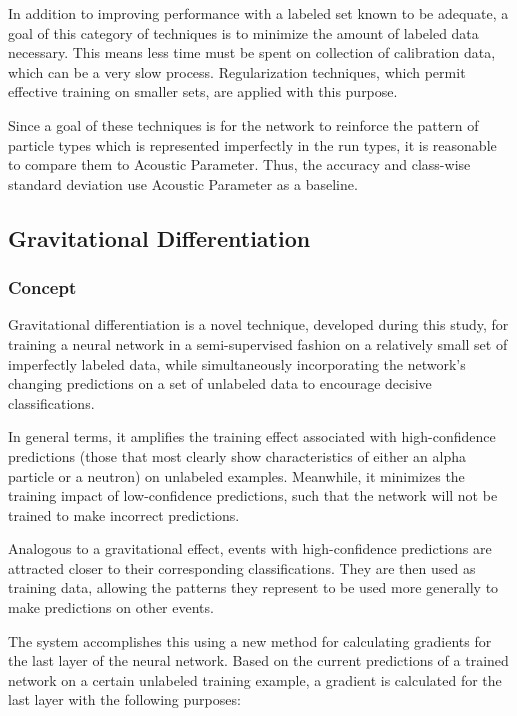 \documentclass[10pt]{article}
\begin{document}
In addition to improving performance with a labeled set known to be adequate, a goal of this category of techniques is to minimize the amount of labeled data necessary. This means less time must be spent on collection of calibration data, which can be a very slow process. Regularization techniques, which permit effective training on smaller sets, are applied with this purpose.

Since a goal of these techniques is for the network to reinforce the pattern of particle types which is represented imperfectly in the run types, it is reasonable to compare them to Acoustic Parameter. Thus, the accuracy and class-wise standard deviation use Acoustic Parameter as a baseline.

\subsection{Gravitational Differentiation}

\subsubsection{Concept}

Gravitational differentiation is a novel technique, developed during this study, for training a neural network in a semi-supervised fashion on a relatively small set of imperfectly labeled data, while simultaneously incorporating the network's changing predictions on a set of unlabeled data to encourage decisive classifications.

In general terms, it amplifies the training effect associated with high-confidence predictions (those that most clearly show characteristics of either an alpha particle or a neutron) on unlabeled examples. Meanwhile, it minimizes the training impact of low-confidence predictions, such that the network will not be trained to make incorrect predictions.

Analogous to a gravitational effect, events with high-confidence predictions are attracted closer to their corresponding classifications. They are then used as training data, allowing the patterns they represent to be used more generally to make predictions on other events.

The system accomplishes this using a new method for calculating gradients for the last layer of the neural network. Based on the current predictions of a trained network on a certain unlabeled training example, a gradient is calculated for the last layer with the following purposes:
\end{document}
